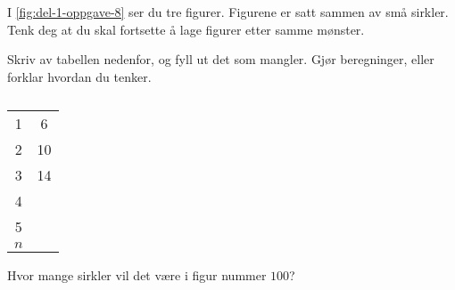 I \cref{fig:del-1-oppgave-8} ser du tre figurer. Figurene er satt sammen av små
sirkler. Tenk deg at du skal fortsette å lage figurer etter samme mønster.

\begin{oppgaver}
     Skriv av tabellen nedenfor, og fyll ut det som mangler. Gjør
    beregninger, eller forklar hvordan du tenker.
\end{oppgaver}

\begin{table}[H]
    \centering
    \caption{}
    \begin{tabular}{| S[table-format=1.0] | S[table-format=2.0] |}
           1   &  6 \\
           2   & 10 \\
           3   & 14 \\
           4   &    \\
           5   &    \\
         {$n$} &    \\ \hline
    \end{tabular}
    \label{tab:del-1-oppgave-1.8}
\end{table}

\begin{oppgaver}
     Hvor mange sirkler vil det være i figur nummer $100$?
\end{oppgaver}

